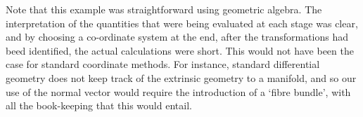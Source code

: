 Note that this example was straightforward using geometric algebra.
The interpretation of the quantities that were being evaluated at each
stage was clear, and by choosing a co-ordinate system at the end,
after the transformations had beed identified, the actual calculations
were short.
This would not have been the case for standard coordinate methods.
For instance, standard differential geometry does not keep track of
the extrinsic geometry to a manifold, and so our use of the normal
vector would require the introduction of a `fibre bundle',
with all the book-keeping that this would entail.


















